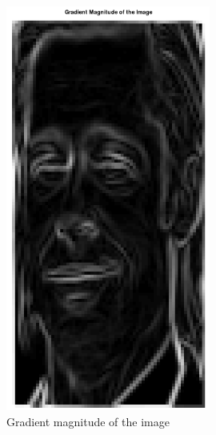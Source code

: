 \documentclass[a4paper]{article}
\begin{document}
\begin{minipage}{0.49\textwidth}
\begin{figure}[H]
    \centering
    \includegraphics[width=0.6\textwidth]{./images/1_gradient_magnitude.png}
    \caption{Gradient magnitude of the image}
\end{figure}
\end{minipage}
\end{document}
